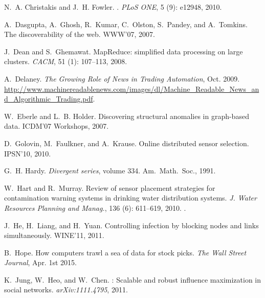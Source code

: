 \begin{thebibliography}{41}
N.~A. Christakis and J.~H. Fowler.
.
\newblock \emph{PLoS ONE}, 5 (9): e12948, 2010.

A.~Dasgupta, A.~Ghosh, R.~Kumar, C.~Olston, S.~Pandey, and A.~Tomkins.
\newblock The discoverability of the web.
\newblock WWW'07, 2007.

J.~Dean and S.~Ghemawat.
\newblock MapReduce: simplified data processing on large clusters.
\newblock \emph{CACM}, 51 (1): 107--113,
  2008.

A.~Delaney.
\newblock \emph{The Growing Role of News in Trading Automation}, Oct. 2009.
\newblock
  \url{http://www.machinereadablenews.com/images/dl/Machine_Readable_News_and_Algorithmic_Trading.pdf}.

W.~Eberle and L.~B. Holder.
\newblock Discovering structural anomalies in graph-based data.
\newblock ICDM'07 Workshops, 2007.

D.~Golovin, M.~Faulkner, and A.~Krause.
\newblock Online distributed sensor selection.
\newblock IPSN'10, 2010.

G.~H. Hardy.
\newblock \emph{Divergent series}, volume 334.
\newblock Am.~Math.~Soc., 1991.

W.~Hart and R.~Murray.
\newblock Review of sensor placement strategies for contamination warning
  systems in drinking water distribution systems.
\newblock \emph{J. Water Resources Planning and Manag.},
  136 (6): 611--619, 2010.
\newblock {}.

J.~He, H.~Liang, and H.~Yuan.
\newblock Controlling infection by blocking nodes and links simultaneously.
\newblock WINE'11, 2011.

B.~Hope.
\newblock How computers trawl a sea of data for stock picks.
\newblock \emph{The Wall Street Journal}, Apr. 1st 2015.

K.~Jung, W.~Heo, and W.~Chen.
: Scalable and robust influence maximization in social
  networks.
\newblock \emph{arXiv:1111.4795}, 2011.


\end{thebibliography}
